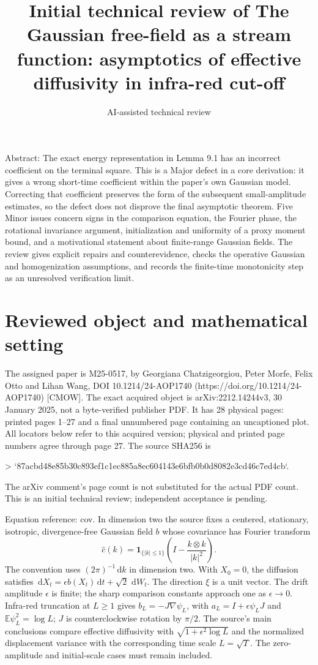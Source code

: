 \documentclass[10pt]{article}
\title{Initial technical review of
The Gaussian free-field as a stream function:
asymptotics of effective diffusivity in infra-red cut-off}
\author{AI-assisted technical review}
\date{}
\begin{document}
\maketitle
Abstract: The exact energy representation in Lemma 9.1 has an incorrect coefficient on the terminal square. This is a Major defect in a core derivation: it gives a wrong short-time coefficient within the paper’s own Gaussian model. Correcting that coefficient preserves the form of the subsequent small-amplitude estimates, so the defect does not disprove the final asymptotic theorem. Five Minor issues concern signs in the comparison equation, the Fourier phase, the rotational invariance argument, initialization and uniformity of a proxy moment bound, and a motivational statement about finite-range Gaussian fields. The review gives explicit repairs and counterevidence, checks the operative Gaussian and homogenization assumptions, and records the finite-time monotonicity step as an unresolved verification limit.\par
\section*{Reviewed object and mathematical setting}
The assigned paper is M25-0517, by Georgiana Chatzigeorgiou, Peter Morfe, Felix Otto and Lihan Wang, DOI 10.1214/24-AOP1740 (https://doi.org/10.1214/24-AOP1740) [CMOW]. The exact acquired object is arXiv:2212.14244v3, 30 January 2025, not a byte-verified publisher PDF. It has 28 physical pages: printed pages 1–27 and a final unnumbered page containing an uncaptioned plot. All locators below refer to this acquired version; physical and printed page numbers agree through page 27. The source SHA256 is\par
> `87acbd48e85b30c893ef1c1ec885a8ec604143e6bfb0b0d8082e3cd46c7ed4cb`.\par
The arXiv comment’s page count is not substituted for the actual PDF count. This is an initial technical review; independent acceptance is pending.\par
Equation reference: cov. In dimension two the source fixes a centered, stationary, isotropic, divergence-free Gaussian field \(b\) whose covariance has Fourier transform \[
 \widehat c(k)=\mathbf1_{\{|k|\leq1\}}
       \left(I-\frac{k\otimes k}{|k|^2}\right).\] The convention uses \((2\pi)^{-1}\,\mathrm dk\) in dimension two. With \(X_0=0\), the diffusion satisfies \(\,\mathrm dX_t=\epsilon b(X_t)\,\mathrm dt+\sqrt2\,\,\mathrm dW_t\). The direction \(\xi\) is a unit vector. The drift amplitude \(\epsilon\) is finite; the sharp comparison constants approach one as \(\epsilon\to0\). Infra-red truncation at \(L\geq1\) gives \(b_L=-J\nabla\psi_L\), with \(a_L=I+\epsilon\psi_LJ\) and \(\mathbb E\psi_L^2=\log L\); \(J\) is counterclockwise rotation by \(\pi/2\). The source’s main conclusions compare effective diffusivity with \(\sqrt{1+\epsilon^2\log L}\) and the normalized displacement variance with the corresponding time scale \(L=\sqrt T\). The zero-amplitude and initial-scale cases must remain included.\par
\end{document}
